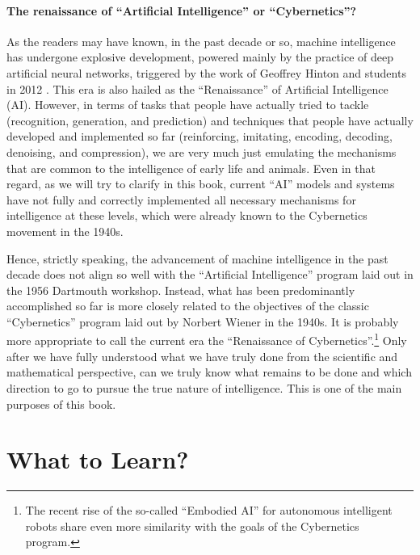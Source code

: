 \documentclass[../../book-main.tex]{subfiles}
\begin{document}
\paragraph{The renaissance of ``Artificial Intelligence'' or ``Cybernetics''?}
As the readers may have known, in the past decade or so, machine intelligence has undergone explosive development, powered mainly by the practice of deep artificial neural networks, triggered by the work of Geoffrey Hinton and students in 2012 \cite{krizhevsky2012imagenet}. This era is also hailed as the ``Renaissance'' of Artificial Intelligence (AI). However, in terms of tasks that people have actually tried to tackle (recognition, generation, and prediction) and techniques that people have actually developed and implemented so far (reinforcing, imitating, encoding, decoding, denoising, and compression), we are very much just emulating the mechanisms that are common to the intelligence of early life and animals. Even in that regard, as we will try to clarify in this book, current ``AI'' models and systems have not fully and correctly implemented all necessary mechanisms for intelligence at these levels, which were already known to the Cybernetics movement in the 1940s. 

Hence, strictly speaking, the advancement of machine intelligence in the past decade does not align so well with the ``Artificial Intelligence'' program laid out in the 1956 Dartmouth workshop. Instead, what has been predominantly accomplished so far is more closely related to the objectives of the classic ``Cybernetics'' program laid out by Norbert Wiener in the 1940s. It is probably more appropriate to call the current era the ``Renaissance of Cybernetics''.\footnote{The recent rise of the so-called ``Embodied AI'' for autonomous intelligent robots share even more similarity with the goals of the Cybernetics program.} Only after we have fully understood what we have truly done from the scientific and mathematical perspective, can we truly know what remains to be done and which direction to go to pursue the true nature of intelligence. This is one of the main purposes of this book. 


\section{What to Learn?}
\label{sec:what-to-learn}
\end{document}
